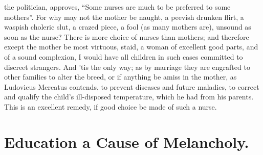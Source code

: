 the politician,  approves,
\enquote{Some nurses are much to be preferred to some mothers}.
For why may not the mother be naught, a peevish drunken flirt, a waspish
choleric slut, a crazed piece, a fool (as many mothers are), unsound as soon as
the nurse? There is more choice of nurses than mothers; and therefore except
the mother be most virtuous, staid, a woman of excellent good parts, and of a
sound complexion, I would have all children in such cases committed to discreet
strangers. And 'tis the only way; as by marriage they are engrafted to other
families to alter the breed, or if anything be amiss in the mother, as
Ludovicus Mercatus contends,  to prevent diseases and future maladies, to correct and qualify the
child's ill-disposed temperature, which he had from his parents. This is an
excellent remedy, if good choice be made of such a nurse.

\section{Education a Cause of Melancholy.}

